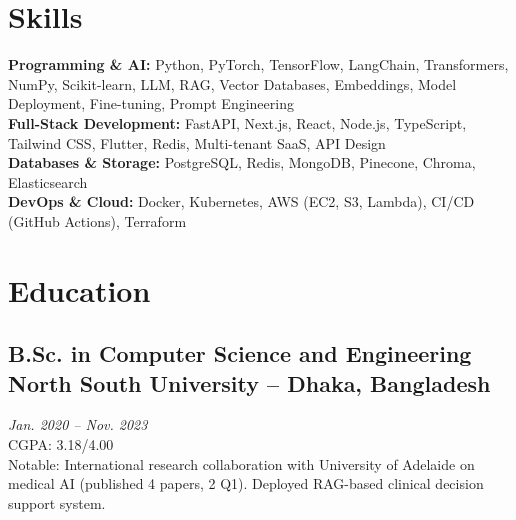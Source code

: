 \documentclass[letterpaper,10pt]{article}
\begin{document}
\section*{Skills}

\RaggedRight
\textbf{Programming \& AI:} Python, PyTorch, TensorFlow, LangChain, Transformers, NumPy, Scikit-learn, LLM, RAG, Vector Databases, Embeddings, Model Deployment, Fine-tuning, Prompt Engineering \\
\textbf{Full-Stack Development:} FastAPI, Next.js, React, Node.js, TypeScript, Tailwind CSS, Flutter, Redis, Multi-tenant SaaS, API Design \\
\textbf{Databases \& Storage:} PostgreSQL, Redis, MongoDB, Pinecone, Chroma, Elasticsearch \\
\textbf{DevOps \& Cloud:} Docker, Kubernetes, AWS (EC2, S3, Lambda), CI/CD (GitHub Actions), Terraform

\section*{Education}

\subsection*{\textbf{B.Sc. in Computer Science and Engineering} \hfill \textbf{North South University} -- Dhaka, Bangladesh}
\textit{Jan. 2020 – Nov. 2023} \\
CGPA: 3.18/4.00 \\
Notable: International research collaboration with University of Adelaide on medical AI (published 4 papers, 2 Q1). Deployed RAG-based clinical decision support system.
\end{document}
